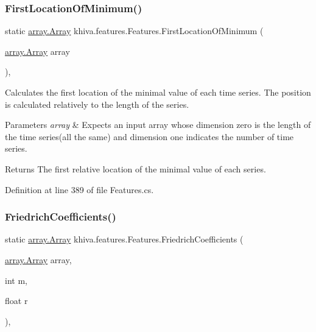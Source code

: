 \subsubsection{\texorpdfstring{First\+Location\+Of\+Minimum()}{FirstLocationOfMinimum()}}
{\footnotesize\ttfamily static \mbox{\hyperlink{classkhiva_1_1array_1_1_array}{array.\+Array}} khiva.\+features.\+Features.\+First\+Location\+Of\+Minimum (\begin{DoxyParamCaption}\item[{\mbox{\hyperlink{classkhiva_1_1array_1_1_array}{array.\+Array}}}]{array }\end{DoxyParamCaption})\hspace{0.3cm}{\ttfamily [inline]}, {\ttfamily [static]}}



Calculates the first location of the minimal value of each time series. The position is calculated relatively to the length of the series. 


\begin{DoxyParams}{Parameters}
{\em array} & Expects an input array whose dimension zero is the length of the time series(all the same) and dimension one indicates the number of time series.\\
\hline
\end{DoxyParams}
\begin{DoxyReturn}{Returns}
The first relative location of the minimal value of each series.
\end{DoxyReturn}


Definition at line 389 of file Features.\+cs.

\mbox{\label{classkhiva_1_1features_1_1_features_a7b79a95ce1b07a35884a41abb3b4248f}} 
\subsubsection{\texorpdfstring{Friedrich\+Coefficients()}{FriedrichCoefficients()}}
{\footnotesize\ttfamily static \mbox{\hyperlink{classkhiva_1_1array_1_1_array}{array.\+Array}} khiva.\+features.\+Features.\+Friedrich\+Coefficients (\begin{DoxyParamCaption}\item[{\mbox{\hyperlink{classkhiva_1_1array_1_1_array}{array.\+Array}}}]{array,  }\item[{int}]{m,  }\item[{float}]{r }\end{DoxyParamCaption})\hspace{0.3cm}{\ttfamily [inline]}, {\ttfamily [static]}}



